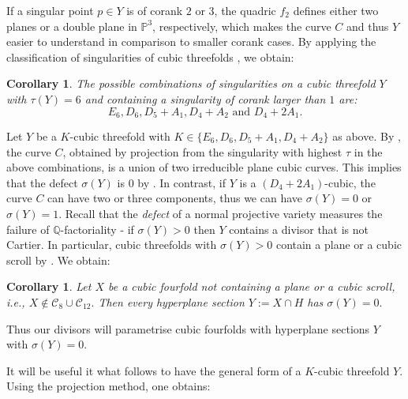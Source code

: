 \documentclass[12pt]{amsart}
\numberwithin{equation}{section}
\theoremstyle{plain}
\newtheorem{corollary}[equation]{Corollary}
\theoremstyle{remark}
\theoremstyle{definition}
\newcommand{\bP}{\mathbb{P}}
\newcommand{\bQ}{\mathbb{Q}}
\newcommand{\calC}{\mathcal{C}}
\begin{document}
If a singular point $p\in Y$ is of corank $2$ or $3$, the quadric $f_2$ defines either two planes or a double plane in $\bP^3$, respectively, which makes the curve $C$ and thus $Y$ easier to understand in comparison to smaller corank cases. By applying the classification of singularities of cubic threefolds \cite{viktorova2023classification}, we obtain:

\begin{corollary}
    The possible combinations of singularities on a cubic threefold $Y$ with $\tau(Y)=6$ and containing a singularity of corank larger than $1$ are:
    $$E_6, D_6, D_5+A_1, D_4+A_2 \text{ and } D_4+2A_1.$$ 
\end{corollary}

Let $Y$ be a $K$-cubic threefold with $K\in \{E_6, D_6, D_5+A_1, D_4+A_2\}$ as above. By \cite[Propositions 3.11, 3.14]{viktorova2023classification}, the curve $C$, obtained by projection from the singularity with highest $\tau$ in the above combinations, is a union of two irreducible plane cubic curves.
This implies that the defect $\sigma(Y)$ is $0$ by \cite[Theorem 1.1]{MV25}.
In contrast, if $Y$ is a $(D_4+2A_1)$-cubic, the curve $C$ can have two or three components, thus we can have $\sigma(Y)=0$ or $\sigma(Y)=1$. 
 Recall that the \textit{defect} of a normal projective variety measures the failure of $\bQ$-factoriality - if $\sigma(Y)>0$ then $Y$ contains a divisor that is not Cartier. In particular, cubic threefolds with $\sigma(Y)>0$ contain a plane or a cubic scroll by \cite[Theorem 1.5]{MV25}. We obtain:

\begin{corollary}
    Let $X$ be a cubic fourfold not containing a plane or a cubic scroll, i.e., $X\notin\calC_8\cup \calC_{12}.$ Then every hyperplane section $Y:=X\cap H$ has $\sigma(Y)=0.$
\end{corollary}
Thus our divisors will parametrise cubic fourfolds with hyperplane sections $Y$ with $\sigma(Y)=0.$

It will be useful it what follows to have the general form of a $K$-cubic threefold $Y$. Using the projection method, one obtains:
\end{document}
